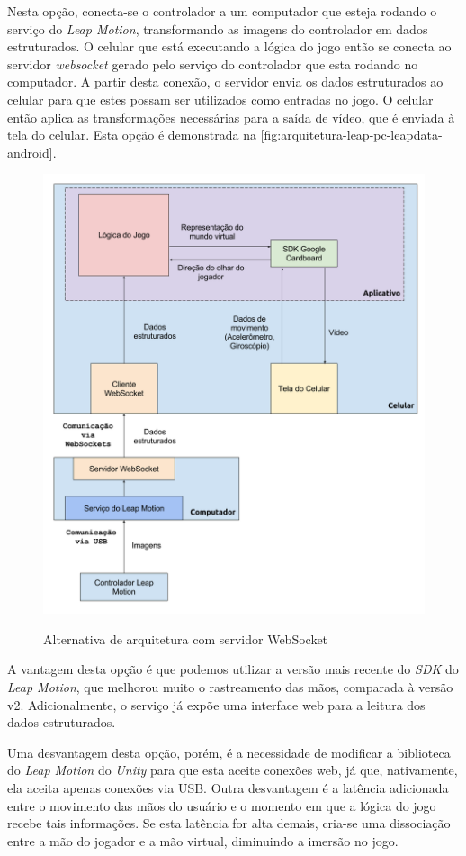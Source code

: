 Nesta opção, conecta-se o controlador a um computador que esteja rodando o 
serviço do \textit{Leap Motion}, transformando as imagens do controlador em 
dados estruturados. O celular que está executando a lógica do jogo então se
conecta ao servidor \textit{websocket} gerado pelo serviço do controlador que 
esta rodando no computador. A partir desta conexão, o servidor envia os
dados estruturados ao celular para que estes possam ser utilizados como 
entradas no jogo. O celular então aplica as transformações necessárias para 
a saída de vídeo, que é enviada à tela do celular.
Esta opção é demonstrada na \autoref{fig:arquitetura-leap-pc-leapdata-android}.

\begin{figure}[ht]
	\centering
	\caption{Alternativa de arquitetura com servidor WebSocket}
	\includegraphics[width=0.7\linewidth]{images/Arquitetura-leap-pc-leapdata-android}
	\legend{\fonteAP}
	\label{fig:arquitetura-leap-pc-leapdata-android}
\end{figure}

A vantagem desta opção é que podemos utilizar a versão mais recente 
do \textit{SDK} do \textit{Leap Motion}, que melhorou muito o rastreamento das 
mãos, comparada à versão v2. Adicionalmente, o serviço já expõe uma interface 
web para a leitura dos dados estruturados. 

Uma desvantagem desta opção, porém, é a necessidade de modificar a biblioteca 
do \textit{Leap Motion} do \textit{Unity} para que esta aceite conexões web, já 
que, nativamente, ela aceita apenas conexões via USB. Outra desvantagem é a 
latência adicionada entre o movimento das mãos do usuário e o momento em que 
a lógica do jogo recebe tais informações. Se esta latência for alta demais, 
cria-se uma dissociação entre a mão do jogador e a mão virtual, 
diminuindo a imersão no jogo.

